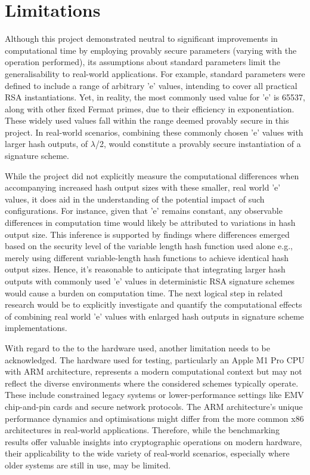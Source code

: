 \documentclass[]{final_report}
\theoremstyle{definition}
\begin{document}
\section{Limitations}
Although this project demonstrated neutral to significant improvements in computational time by employing provably secure parameters (varying with the operation performed), its assumptions about standard parameters limit the generalisability to real-world applications. For example, standard parameters were defined to include a range of arbitrary 'e' values, intending to cover all practical RSA instantiations. Yet, in reality, the most commonly used value for 'e' is 65537, along with other fixed Fermat primes, due to their efficiency in exponentiation.  These widely used values fall within the range deemed provably secure in this project.  In real-world scenarios, combining these commonly chosen 'e' values with larger hash outputs, of $\lambda$/2, would constitute a provably secure instantiation of a signature scheme.

While the project did not explicitly measure the computational differences when accompanying increased hash output sizes with these smaller, real world 'e' values, it does aid in the understanding of the potential impact of such configurations. For instance, given that 'e' remains constant, any observable differences in computation time would likely be attributed to variations in hash output size. This inference is supported by findings where differences emerged based on the security level of the variable length hash function used alone e.g., merely using different variable-length hash functions to achieve identical hash output sizes.
Hence, it's reasonable to anticipate that integrating larger hash outputs with commonly used 'e' values in deterministic RSA signature schemes would cause a burden on computation time. The next logical step in related research would be to explicitly investigate and quantify the computational effects of combining real world 'e' values with enlarged hash outputs in signature scheme implementations.

With regard to the to the hardware used, another limitation needs to be acknowledged. The hardware used for testing, particularly an Apple M1 Pro CPU with ARM architecture, represents a modern computational context but may not reflect the diverse environments where the considered schemes typically operate. These include constrained legacy systems or lower-performance settings like EMV chip-and-pin cards and secure network protocols. The ARM architecture's unique performance dynamics and optimisations might differ from the more common x86 architectures in real-world applications. Therefore, while the benchmarking results offer valuable insights into cryptographic operations on modern hardware, their applicability to the wide variety of real-world scenarios, especially where older systems are still in use, may be limited.
\end{document}

